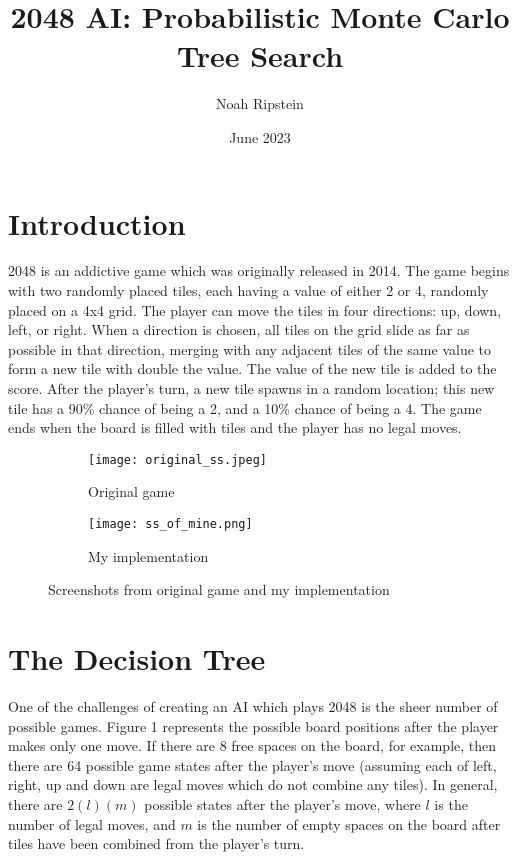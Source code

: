 \documentclass{article}
\title{2048 AI: Probabilistic Monte Carlo Tree Search}
\author{Noah Ripstein}
\date{June 2023}
\begin{document}
\maketitle

\section{Introduction}

2048 is an addictive game which was originally released in 2014.  The game begins with two randomly placed tiles, each having a value of either 2 or 4, randomly placed on a 4x4 grid. The player can move the tiles in four directions: up, down, left, or right. When a direction is chosen, all tiles on the grid slide as far as possible in that direction, merging with any adjacent tiles of the same value to form a new tile with double the value.  The value of the new tile is added to the score. After the player's turn,  a new tile spawns in a random location; this new tile has a 90\% chance of being a 2, and a 10\% chance of being a 4.   The game ends when the board is filled with tiles and the player has no legal moves.



\begin{figure}[htbp]
  \centering
  \begin{subfigure}[b]{0.45\textwidth}
    \texttt{[image: original\_ss.jpeg]}
    \caption{Original game}
    \label{fig:original_ss}
  \end{subfigure}
  \hfill
  \begin{subfigure}[b]{0.45\textwidth}
    \texttt{[image: ss\_of\_mine.png]}
    \caption{My implementation}
    \label{fig:ss_of_mine}
  \end{subfigure}
  \caption{Screenshots from original game and my implementation}
  \label{fig:screenshots}
\end{figure}

\section{The Decision Tree}

One of the challenges of creating an AI which plays 2048 is the sheer number of possible games.  Figure 1 represents the possible board positions after the player makes only one move.  If there are 8 free spaces on the board, for example, then there are 64 possible game states after the player's move (assuming each of left, right, up and down are legal moves which do not combine any tiles).  In general, there are $2(l)(m)$ possible states after the player's move, where $l$ is the number of legal moves, and $m$ is the number of empty spaces on the board after tiles have been combined from the player's turn.
\end{document}
